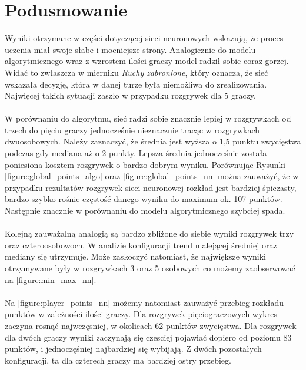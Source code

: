 \documentclass[12pt, oneside]{report}
\begin{document}
\section{Podusmowanie}
Wyniki otrzymane w części dotyczącej sieci neuronowych wskazują, że proces uczenia miał swoje słabe i mocniejsze strony. Analogicznie do modelu algorytmicznego wraz z wzrostem ilości graczy model radził sobie coraz gorzej. Widać to zwłaszcza w mierniku \textit{Ruchy zabronione}, który oznacza, że sieć wskazała decyzję, która w danej turze była niemożliwa do zrealizowania. Najwięcej takich sytuacji zaszło w przypadku rozgrywek dla 5 graczy. \\ \\
W porównaniu do algorytmu, sieć radzi sobie znacznie lepiej w rozgrywkach od trzech do pięciu graczy jednocześnie nieznacznie tracąc w rozgrywkach dwuosobowych. Należy zaznaczyć, że średnia jest wyższa o 1,5 punktu zwycięstwa podczas gdy mediana aż o 2 punkty. Lepsza średnia jednocześnie została poniesiona kosztem rozgrywek o bardzo dobrym wyniku. Porównując Rysunki \ref{figure:global_points_algo} oraz \ref{figure:global_points_nn} można zauważyć, że w przypadku rezultatów rozgrywek sieci neuronowej rozkład jest bardziej śpiczasty, bardzo szybko rośnie częstość danego wyniku do maximum ok. 107 punktów. Następnie znacznie w porównaniu do modelu algorytmicznego szybciej spada. \\ \\
Kolejną zauważalną analogią są bardzo zbliżone do siebie wyniki rozgrywek trzy oraz czteroosobowoch. W analizie konfiguracji trend malejącej średniej oraz mediany się utrzymuje. Może zaskoczyć natomiast, że największe wyniki otrzymywane były w rozgrywkach 3 oraz 5 osobowych co możemy zaobserwować na \ref{figure:min_max_nn}. \\ \\
Na \ref{figure:player_points_nn} możemy natomiast zauważyć przebieg rozkładu punktów w zależności ilości graczy. Dla rozgrywek pięciograczowych wykres zaczyna rosnąć najwczęsniej, w okolicach 62 punktów zwycięstwa. Dla rozgrywek dla dwóch graczy wyniki zaczynają się czesciej pojawiać dopiero od poziomu 83 punktów, i jednoczęśniej najbardziej się wybijają. Z dwóch pozostałych konfiguracji, ta dla czterech graczy ma bardziej ostry przebieg. \\ \\
\end{document}
